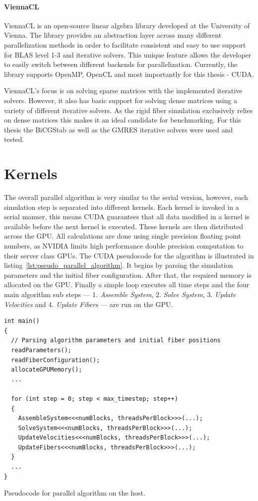 \documentclass[a4paper,11pt]{kth-mag}
\begin{document}
\paragraph{ViennaCL}
ViennaCL is an open-source linear algebra library developed at the University of Vienna. The library provides an abstraction layer across many different parallelization methods in order to facilitate consistent and easy to use support for BLAS level 1-3 and iterative solvers. This unique feature allows the developer to easily switch between different backends for parallelization. Currently, the library supports OpenMP, OpenCL and most importantly for this thesis - CUDA.

ViennaCL's focus is on solving sparse matrices with the implemented iterative solvers. However, it also has basic support for solving dense matrices using a variety of different iterative solvers. As the rigid fiber simulation exclusively relies on dense matrices this makes it an ideal candidate for benchmarking. For this thesis the BiCGStab as well as the GMRES iterative solvers were used and tested.

\section{Kernels}
\label{sec:kernels}

The overall parallel algorithm is very similar to the serial version, however, each simulation step is separated into different kernels. Each kernel is invoked in a serial manner, this means CUDA guarantees that all data modified in a kernel is available before the next kernel is executed. These kernels are then distributed across the GPU. All calculations are done using single precision floating point numbers, as NVIDIA limits high performance double precision computation to their server class GPUs. The CUDA pseudocode for the algorithm is illustrated in listing~\ref{lst:pseudo_parallel_algorithm}. It begins by parsing the simulation parameters and the initial fiber configuration. After that, the required memory is allocated on the GPU. Finally a simple loop executes all time steps and the four main algorithm sub steps — 1. \emph{Assemble System}, 2. \emph{Solve System}, 3. \emph{Update Velocities} and 4. \emph{Update Fibers} — are run on the GPU.

\begin{listing}[!htbp]
  \centering
  \begin{verbatim}
int main()
{
  // Parsing algorithm parameters and initial fiber positions
  readParameters();
  readFiberConfiguration();
  allocateGPUMemory();
  ...

  for (int step = 0; step < max_timestep; step++)
  {
    AssembleSystem<<<numBlocks, threadsPerBlock>>>(...);
    SolveSystem<<<numBlocks, threadsPerBlock>>>(...);
    UpdateVelocities<<<numBlocks, threadsPerBlock>>>(...);
    UpdateFibers<<<numBlocks, threadsPerBlock>>>(...);
  }
  ...
}
  \end{verbatim}
  \caption{Pseudocode for parallel algorithm on the host.}
  \label{lst:pseudo_parallel_algorithm}
\end{listing}
\end{document}
